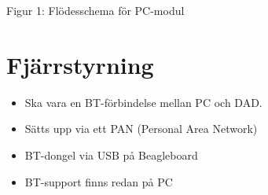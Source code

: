 	\centerline{Figur 1: Flödesschema för PC-modul}
	\centerline{} %
	\centerline{}
	\pagebreak	
	
	\section{Fjärrstyrning}
	\begin{itemize}
		\item Ska vara en BT-förbindelse mellan PC och DAD.
		\item Sätts upp via ett PAN (Personal Area Network)
		\item BT-dongel via USB på Beagleboard
		\item BT-support finns redan på PC
	\end{itemize}
%